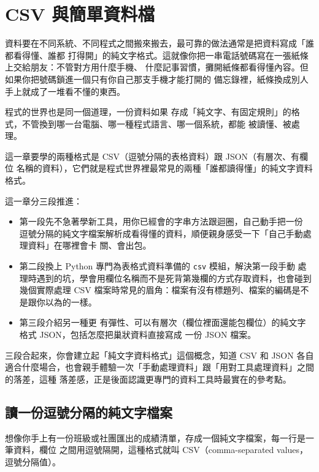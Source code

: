 \chapter{CSV 與簡單資料檔}
\label{ch:csv}

資料要在不同系統、不同程式之間搬來搬去，最可靠的做法通常是把資料寫成「誰都看得懂、誰都
打得開」的純文字格式。這就像你把一串電話號碼寫在一張紙條上交給朋友：不管對方用什麼手機、
什麼記事習慣，攤開紙條都看得懂內容。但如果你把號碼鎖進一個只有你自己那支手機才能打開的
備忘錄裡，紙條換成別人手上就成了一堆看不懂的東西。

程式的世界也是同一個道理，一份資料如果
存成「純文字、有固定規則」的格式，不管換到哪一台電腦、哪一種程式語言、哪一個系統，都能
被讀懂、被處理。

這一章要學的兩種格式是 CSV（逗號分隔的表格資料）跟 JSON（有層次、有欄位
名稱的資料），它們就是程式世界裡最常見的兩種「誰都讀得懂」的純文字資料格式。

這一章分三段推進：

\begin{itemize}
\item 第一段先不急著學新工具，用你已經會的字串方法跟迴圈，自己動手把一份
逗號分隔的純文字檔案解析成看得懂的資料，順便親身感受一下「自己手動處理資料」在哪裡會卡
關、會出包。
\item 第二段換上 Python 專門為表格式資料準備的 \texttt{csv} 模組，解決第一段手動
處理時遇到的坑，學會用欄位名稱而不是死背第幾欄的方式存取資料，也會碰到幾個實際處理 CSV
檔案時常見的眉角：檔案有沒有標題列、檔案的編碼是不是跟你以為的一樣。
\item 第三段介紹另一種更
有彈性、可以有層次（欄位裡面還能包欄位）的純文字格式 JSON，包括怎麼把巢狀資料直接寫成
一份 JSON 檔案。
\end{itemize}

三段合起來，你會建立起「純文字資料格式」這個概念，知道 CSV 和 JSON
各自適合什麼場合，也會親手體驗一次「手動處理資料」跟「用對工具處理資料」之間的落差，這種
落差感，正是後面認識更專門的資料工具時最實在的參考點。

\section{讀一份逗號分隔的純文字檔案}
\label{sec:csv-manual-read}

想像你手上有一份班級或社團匯出的成績清單，存成一個純文字檔案，每一行是一筆資料，欄位
之間用逗號隔開，這種格式就叫 CSV（comma-separated values，逗號分隔值）。

